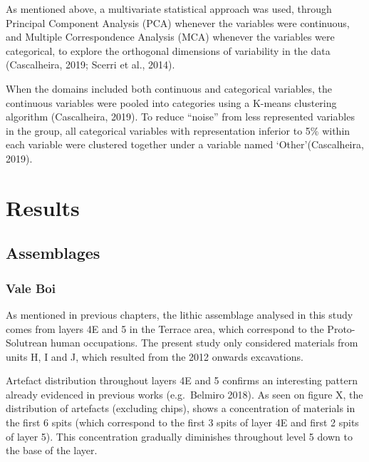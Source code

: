 \documentclass[12pt,twoside]{reedthesis}
\begin{document}
As mentioned above, a multivariate statistical approach was used, through Principal Component Analysis (PCA) whenever the variables were continuous, and Multiple Correspondence Analysis (MCA) whenever the variables were categorical, to explore the orthogonal dimensions of variability in the data (Cascalheira, 2019; Scerri et al., 2014).

When the domains included both continuous and categorical variables, the continuous variables were pooled into categories using a K-means clustering algorithm (Cascalheira, 2019). To reduce ``noise'' from less represented variables in the group, all categorical variables with representation inferior to 5\% within each variable were clustered together under a variable named `Other'(Cascalheira, 2019).

\hypertarget{results}{%
\chapter{Results}\label{results}}

\hypertarget{assemblages}{%
\section{Assemblages}\label{assemblages}}

\hypertarget{vale-boi-2}{%
\subsection{Vale Boi}\label{vale-boi-2}}

As mentioned in previous chapters, the lithic assemblage analysed in this study comes from layers 4E and 5 in the Terrace area, which correspond to the Proto-Solutrean human occupations. The present study only considered materials from units H, I and J, which resulted from the 2012 onwards excavations.

Artefact distribution throughout layers 4E and 5 confirms an interesting pattern already evidenced in previous works (e.g.~Belmiro 2018). As seen on figure X, the distribution of artefacts (excluding chips), shows a concentration of materials in the first 6 spits (which correspond to the first 3 spits of layer 4E and first 2 spits of layer 5). This concentration gradually diminishes throughout level 5 down to the base of the layer.
\end{document}
